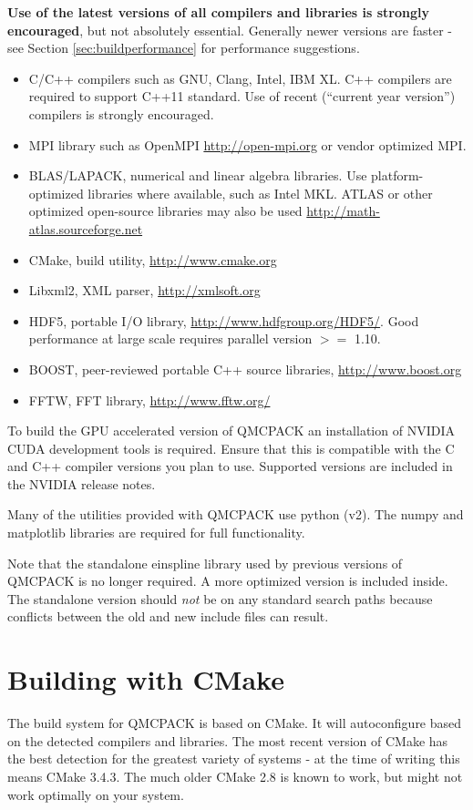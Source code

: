 \textbf{Use of the latest versions of all compilers and libraries is
strongly encouraged}, but not absolutely essential. Generally newer versions are faster - see
Section \ref{sec:buildperformance} for performance suggestions.

\begin{itemize}
\item C/C++ compilers such as GNU, Clang, Intel, IBM XL. C++ compilers
  are required to support C++11 standard. Use of recent (``current
  year version'') compilers is strongly encouraged.
\item MPI library such as OpenMPI \url{http://open-mpi.org} or vendor
  optimized MPI.
\item BLAS/LAPACK, numerical and linear algebra libraries. Use
  platform-optimized libraries where available, such as Intel MKL.
  ATLAS or other optimized open-source libraries may also be used
  \url{http://math-atlas.sourceforge.net}
\item CMake, build utility, \url{http://www.cmake.org}
\item Libxml2, XML parser, \url{http://xmlsoft.org}
\item HDF5, portable I/O library, \url{http://www.hdfgroup.org/HDF5/}. Good performance at large scale requires parallel version $>=$ 1.10.
\item BOOST, peer-reviewed portable C++ source libraries, \url{http://www.boost.org}
\item FFTW, FFT library, \url{http://www.fftw.org/}
\end{itemize}

To build the GPU accelerated version of QMCPACK an installation of
NVIDIA CUDA development tools is required. Ensure that this is
compatible with the C and C++ compiler versions you plan to
use. Supported versions are included in the NVIDIA release notes.

Many of the utilities provided with QMCPACK use python (v2). The numpy
and matplotlib libraries are required for full functionality.

Note that the standalone einspline library used by previous versions of QMCPACK
is no longer required. A more optimized version is included
inside. The standalone version should \emph{not} be on any standard
search paths because conflicts between the old and new include files
can result.

\section{Building with CMake}
\label{sec:cmake}
The build system for QMCPACK is based on CMake.  It will autoconfigure
based on the detected compilers and libraries. The most recent
version of CMake has the best detection for the greatest variety of
systems - at the time of writing this means CMake 3.4.3. The much
older CMake 2.8 is known to work, but might not work optimally on your system.

